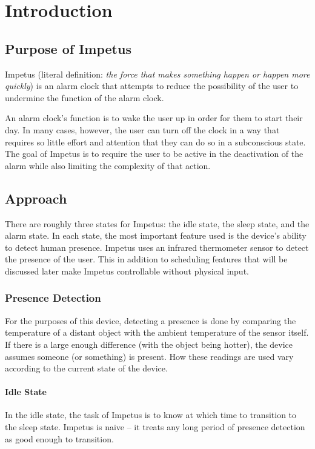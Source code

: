 \chapter{Introduction}
\section{Purpose of Impetus}
Impetus (literal definition: \emph{the force that makes something
  happen or happen more quickly}) is an alarm clock that attempts to
reduce the possibility of the user to undermine the function of the
alarm clock.

An alarm clock's function is to wake the user up in order for them to
start their day. In many cases, however, the user can turn off the
clock in a way that requires so little effort and attention that they
can do so in a subconscious state. The goal of Impetus is to require
the user to be active in the deactivation of the alarm while also
limiting the complexity of that action.

\section{Approach}
There are roughly three states for Impetus: the idle state, the sleep
state, and the alarm state. In each state, the most important feature
used is the device's ability to detect human presence. Impetus uses an
infrared thermometer sensor to detect the presence of the user. This
in addition to scheduling features that will be discussed later make
Impetus controllable without physical input.

\subsection{Presence Detection}
For the purposes of this device, detecting a presence is done by
comparing the temperature of a distant object with the ambient
temperature of the sensor itself. If there is a large enough
difference (with the object being hotter), the device assumes someone
(or something) is present. How these readings are used vary according
to the current state of the device.

\subsubsection{Idle State}
In the idle state, the task of Impetus is to know at which time to
transition to the sleep state. Impetus is naive -- it treats any long
period of presence detection as good enough to transition.


